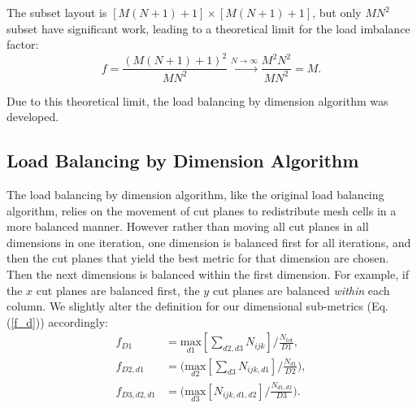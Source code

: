 \documentclass[letterpaper]{mandc2019}
\begin{document}
The subset layout is $[M(N+1)+1] \times [M(N+1)+1]$, but only $MN^2$ subset have significant work, leading to a theoretical limit for the load imbalance factor:
\begin{equation}
f= \frac{\left( M(N+1)+1 \right)^2}{MN^2} \xrightarrow{N\to \infty} \frac{M^2N^2}{MN^2} = M.
\end{equation}

Due to this theoretical limit, the load balancing by dimension algorithm was developed.

\subsection{Load Balancing by Dimension Algorithm}

The load balancing by dimension algorithm, like the original load balancing algorithm, relies on the movement of cut planes to redistribute mesh cells in a more balanced manner. However rather than moving all cut planes in all dimensions in one iteration, one dimension is balanced first for all iterations, and then the cut planes that yield the best metric for that dimension are chosen. Then the next dimensions is balanced within the first dimension. For example, if the $x$ cut planes are balanced first, the $y$ cut planes are balanced \textit{within} each column.
We slightly alter the definition for our dimensional sub-metrics (Eq. (\ref{f_d})) accordingly:
\begin{align}
f_{D1} &= \underset{d1}{\text{max}}[\sum_{d2,d3} N_{ijk}]/\frac{N_{tot}}{D1}, \label{f_d1} \\
f_{D2,d1} &= \Big(\underset{d2}{\text{max}}[\sum_{d3} N_{ijk,d1}]/\frac{N_{d1}}{D2}\Big), \label{f_d2}\\
f_{D3,d2,d1} &= \Big( \underset{d3}{\text{max}}[ N_{ijk,d1,d2}]/\frac{N_{d1,d2}}{D3} \Big) . \label{f_d3}
\end{align}
\end{document}
